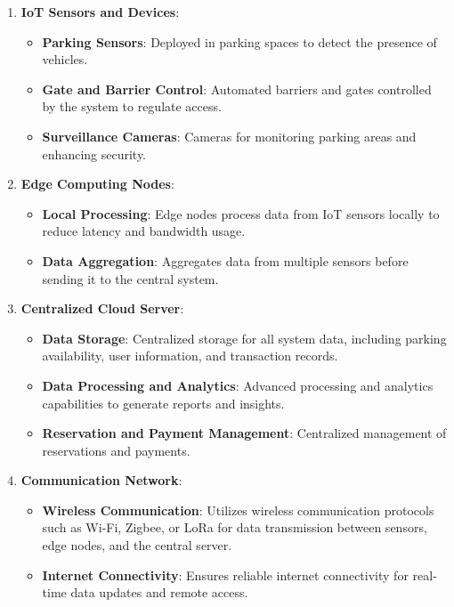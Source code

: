 \documentclass[oneside, 12pt, a4paper, draft]{book}
\begin{document}
\begin{enumerate}
\item \textbf{\textbf{IoT Sensors and Devices}}:
\begin{itemize}
\item \textbf{\textbf{Parking Sensors}}: Deployed in parking spaces to detect the presence of vehicles.
\item \textbf{\textbf{Gate and Barrier Control}}: Automated barriers and gates controlled by the system to regulate access.
\item \textbf{\textbf{Surveillance Cameras}}: Cameras for monitoring parking areas and enhancing security.
\end{itemize}

\item \textbf{\textbf{Edge Computing Nodes}}:
\begin{itemize}
\item \textbf{\textbf{Local Processing}}: Edge nodes process data from IoT sensors locally to reduce latency and bandwidth usage.
\item \textbf{\textbf{Data Aggregation}}: Aggregates data from multiple sensors before sending it to the central system.
\end{itemize}

\item \textbf{\textbf{Centralized Cloud Server}}:
\begin{itemize}
\item \textbf{\textbf{Data Storage}}: Centralized storage for all system data, including parking availability, user information, and transaction records.
\item \textbf{\textbf{Data Processing and Analytics}}: Advanced processing and analytics capabilities to generate reports and insights.
\item \textbf{\textbf{Reservation and Payment Management}}: Centralized management of reservations and payments.
\end{itemize}

\item \textbf{\textbf{Communication Network}}:
\begin{itemize}
\item \textbf{\textbf{Wireless Communication}}: Utilizes wireless communication protocols such as Wi-Fi, Zigbee, or LoRa for data transmission between sensors, edge nodes, and the central server.
\item \textbf{\textbf{Internet Connectivity}}: Ensures reliable internet connectivity for real-time data updates and remote access.
\end{itemize}


\end{enumerate}
\end{document}
